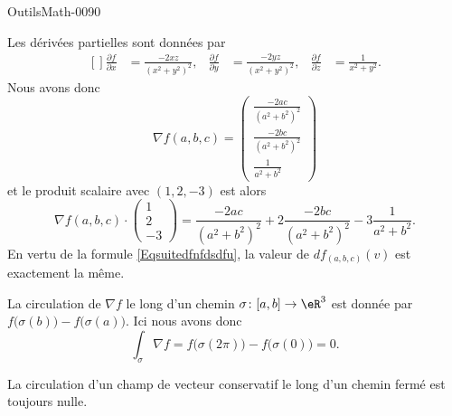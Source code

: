 
\begin{corrige}{OutilsMath-0090}

    Les dérivées partielles sont données par
    \begin{equation}
        \begin{aligned}[]
            \frac{ \partial f }{ \partial x }&=\frac{ -2xz }{ (x^2+y^2)^2 },&\frac{ \partial f }{ \partial y }&=\frac{ -2yz }{ (x^2+y^2)^2 },&\frac{ \partial f }{ \partial z }&=\frac{1}{ x^2+y^2 }.
        \end{aligned}
    \end{equation}
    Nous avons donc
    \begin{equation}
        \nabla f(a,b,c)=\begin{pmatrix}
            \frac{ -2ac }{ (a^2+b^2)^2 }    \\ 
            \frac{ -2bc }{ (a^2+b^2)^2 }    \\ 
            \frac{ 1 }{ a^2+b^2 }    
        \end{pmatrix}
    \end{equation}
    et le produit scalaire avec $(1,2,-3)$ est alors 
    \begin{equation}
        \nabla f(a,b,c)\cdot\begin{pmatrix}
            1    \\ 
            2    \\ 
            -3    
        \end{pmatrix}=
            \frac{ -2ac }{ (a^2+b^2)^2 }  +2        \frac{ -2bc }{ (a^2+b^2)^2 }    -3        \frac{ 1 }{ a^2+b^2 }    .
    \end{equation}
    En vertu de la formule \eqref{Eqsuitedfnfdsdfu}, la valeur de $df_{(a,b,c)}(v)$ est exactement la même.

    La circulation de $\nabla f$ le long d'un chemin $\sigma\colon \mathopen[ a , b \mathclose]\to \eR^3$ est donnée par $f\big( \sigma(b) \big)-f\big( \sigma(a) \big)$. Ici nous avons donc
    \begin{equation}
        \int_{\sigma}\nabla f=f\big( \sigma(2\pi) \big)-f\big( \sigma(0) \big)=0.
    \end{equation}
    
    La circulation d'un champ de vecteur conservatif le long d'un chemin fermé est toujours nulle.


\end{corrige}
